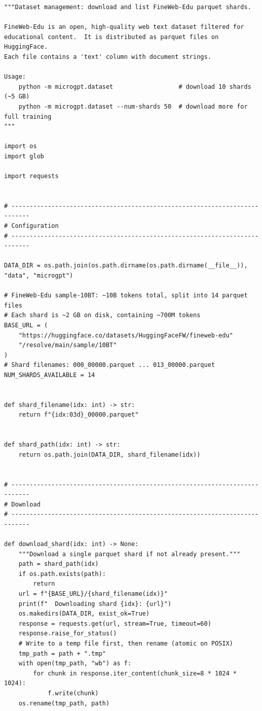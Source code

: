 \begin{lstlisting}
"""Dataset management: download and list FineWeb-Edu parquet shards.

FineWeb-Edu is an open, high-quality web text dataset filtered for
educational content.  It is distributed as parquet files on HuggingFace.
Each file contains a 'text' column with document strings.

Usage:
    python -m microgpt.dataset                  # download 10 shards (~5 GB)
    python -m microgpt.dataset --num-shards 50  # download more for full training
"""

import os
import glob

import requests


# ---------------------------------------------------------------------------
# Configuration
# ---------------------------------------------------------------------------

DATA_DIR = os.path.join(os.path.dirname(os.path.dirname(__file__)), "data", "microgpt")

# FineWeb-Edu sample-10BT: ~10B tokens total, split into 14 parquet files
# Each shard is ~2 GB on disk, containing ~700M tokens
BASE_URL = (
    "https://huggingface.co/datasets/HuggingFaceFW/fineweb-edu"
    "/resolve/main/sample/10BT"
)
# Shard filenames: 000_00000.parquet ... 013_00000.parquet
NUM_SHARDS_AVAILABLE = 14


def shard_filename(idx: int) -> str:
    return f"{idx:03d}_00000.parquet"


def shard_path(idx: int) -> str:
    return os.path.join(DATA_DIR, shard_filename(idx))


# ---------------------------------------------------------------------------
# Download
# ---------------------------------------------------------------------------

def download_shard(idx: int) -> None:
    """Download a single parquet shard if not already present."""
    path = shard_path(idx)
    if os.path.exists(path):
        return
    url = f"{BASE_URL}/{shard_filename(idx)}"
    print(f"  Downloading shard {idx}: {url}")
    os.makedirs(DATA_DIR, exist_ok=True)
    response = requests.get(url, stream=True, timeout=60)
    response.raise_for_status()
    # Write to a temp file first, then rename (atomic on POSIX)
    tmp_path = path + ".tmp"
    with open(tmp_path, "wb") as f:
        for chunk in response.iter_content(chunk_size=8 * 1024 * 1024):
            f.write(chunk)
    os.rename(tmp_path, path)



\end{lstlisting}
